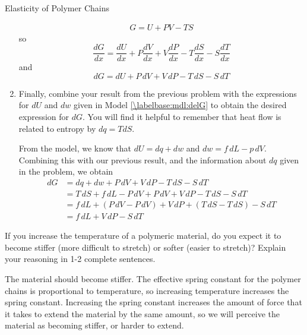 \begin{activity}{Elasticity of Polymer Chains}
\begin{exercises}
\begin{enumerate}
				\begin{solution}{}
					\begin{align*}
						G = U + PV - TS
					\end{align*}
					so
					\begin{equation*}
						\frac{dG}{dx} = \frac{dU}{dx} + P\frac{dV}{dx} + V\frac{dP}{dx} - T\frac{dS}{dx} - S\frac{dT}{dx}
					\end{equation*}
					and
					\begin{equation*}
						dG = dU + P\,dV + V\,dP - T\,dS - S\,dT
					\end{equation*}
				\end{solution}
				
			\item Finally, combine your result from the previous problem with the expressions for $dU$ and $dw$ given in Model \ref{\labelbase:mdl:delG} to obtain the desired expression for $dG$.  You will find it helpful to remember that heat flow is related to entropy by $dq = T dS$.
			
				\begin{solution}{}
					From the model, we know that $dU = dq + dw$ and $dw = f\,dL - p\,dV$.  Combining this with our previous result, and the information about $dq$ given in the problem, we obtain
					\begin{align*}
						dG &= dq + dw + P\,dV + V\,dP - T\,dS - S\,dT\\
						   &= T\,dS + f\,dL - P\,dV + P\,dV + V\,dP - T\,dS - S\,dT\\
						   &= f\,dL + (P\,dV - P\,dV) + V\,dP + (T\,dS - T\,dS) - S\,dT\\
						   &= f\,dL + V\,dP - S\,dT
					\end{align*}
				\end{solution}
		\end{enumerate}

	\exercise If you increase the temperature of a polymeric material, do you expect it to become stiffer (more difficult to stretch) or softer (easier to stretch)?  Explain your reasoning in 1-2 complete sentences.
	
		\begin{solution}{}
			The material should become stiffer.  The effective spring constant for the polymer chains is proportional to temperature, so increasing temperature increases the spring constant.  Increasing the spring constant increases the amount of force that it takes to extend the material by the same amount, so we will perceive the material as becoming stiffer, or harder to extend.
		\end{solution}
\end{exercises}
	
\end{activity}